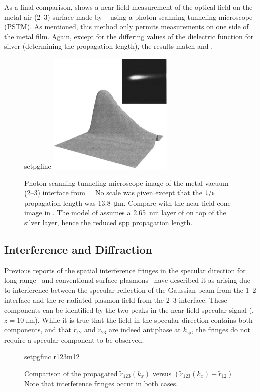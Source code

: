 As a final comparison,  shows a near-field
measurement of the optical field on the metal-air (2--3) surface made by
~\cite{dawson2001surface} using a photon scanning tunneling
microscope (PSTM).  As mentioned, this method only permits measurements on one
side of the metal film.  Again, except for the differing values of the
dielectric function for silver (determining the propagation length), the
results match  and .
\begin{figure}[ht]
  \centering
  {setpgfinc}
  \includegraphics[keepaspectratio,width=6cm]{interference/figures/DawsonTransmitted.png}
  \caption{Photon scanning tunneling microscope image of the metal-vacuum (2--3)
    interface from ~\cite{dawson2001surface}.  No scale was
    given except that the $1/{\mathrm{e}}$ propagation length was
    \SI{13.8}{\micro\meter}.  Compare with
    the near field cone image in .  The model of
     assumes a \SI{2.65}{\nano\meter} layer of  on
    top of the silver layer, hence the reduced \gls{spp} propagation length.}
  \label{fig:dawsoncompare}
\end{figure}


\subsection{Interference and Diffraction}
Previous reports of the spatial interference fringes in the specular direction
for long-range~\cite{simon2007observation} and conventional surface
plasmons~\cite{schumann2008near} have described it as arising due to
interference between the specular reflection of the Gaussian beam from the
1--2 interface and the re-radiated plasmon field from the 2--3 interface.
These components can be identified by the two peaks in the near field specular
signal (, $z=\SI{10}{\micro\meter}$).  While it is
true that the field in the specular direction contains both components, and
that $\tilde{r}_{12}$ and $\tilde{r}_{23}$ are indeed antiphase at
$k_\text{sp}$, the fringes do not require a specular component to be observed.
\begin{figure}[ht]
  \centering
  {setpgfinc}
  {r123m12}
  \caption{Comparison of the propagated $\tilde{r}_{123}(k_x)$ versus
    $(\tilde{r}_{123}(k_x)-\tilde{r}_{12})$.  Note that interference fringes occur in
    both cases.  }
  \label{fig:r123m12}
\end{figure}

